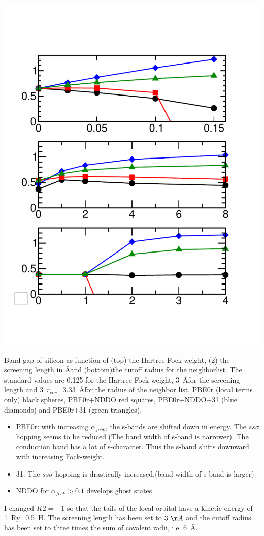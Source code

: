 \documentclass[11pt,a4paper]{report}
\begin{document}
\begin{center}
\includegraphics[width=0.5\linewidth]{Figs/sitests1}
\end{center}
Band gap of silicon as function of (top) the Hartree Fock weight, (2)
the screening length in \AA and (bottom)the cutoff radius for the
neighborlist. The standard values are 0.125 for the Hartree-Fock
weight, 3~\AA for the screening length and 3~$r_{cov}$=3.33~\AA for
the radius of the neighbor list. PBE0r (local terms only) black
spheres, PBE0r+NDDO red squares, PBE0r+NDDO+31 (blue diamonds) and
PBE0r+31 (green triangles).

\begin{itemize}
\item PBE0r: with increasing $\alpha_{fock}$, the s-bands are shifted
  down in energy.  The $ss\sigma$ hopping seems to be reduced (The
  band width of s-band is narrower).  The conduction band has a lot of
  s-character. Thus the s-band shifts downward with increasing
  Fock-weight.
%
\item 31: The $ss\sigma$ hopping is drastically increased.(band width
  of s-band is larger)
%
\item NDDO for $\alpha_{fock}>0.1$ develops ghost states
\end{itemize}

I changed $K2=-1$ so that the tails of the local orbital have a
kinetic energy of 1~Ry=0.5~H. The screening length has been set to
$3~\AA$ and the cutoff radius has been set to three times the sum of
covalent radii, i.e. 6~\AA.





\end{document}
